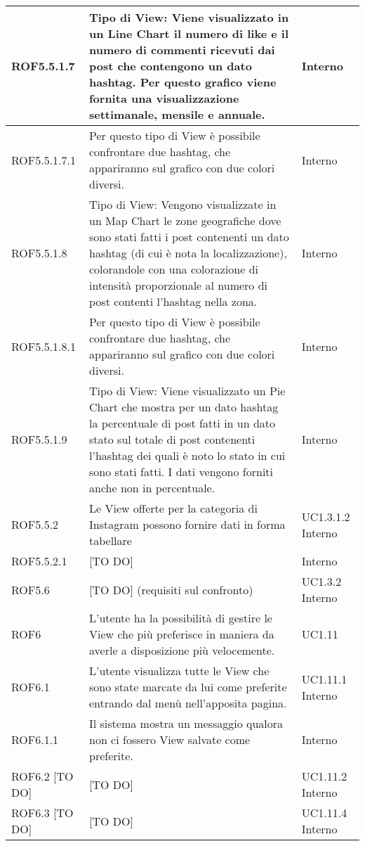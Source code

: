 \begin{center}
\begin{longtable}{| p{2cm} | p{8cm} | p{2cm} |}
		ROF5.5.1.7  &  Tipo di View: Viene visualizzato in un Line Chart il numero di like e il numero di commenti ricevuti dai post che contengono un dato hashtag. Per questo grafico viene fornita una visualizzazione settimanale, mensile e annuale. & Interno \\
		\hline
		ROF5.5.1.7.1  &  Per questo tipo di View è possibile confrontare due hashtag, che appariranno sul grafico con due colori diversi. & Interno \\
		\hline
		ROF5.5.1.8  &  Tipo di View: Vengono visualizzate in un Map Chart le zone geografiche dove sono stati fatti i post contenenti un dato hashtag (di cui è nota la localizzazione), colorandole con una colorazione di intensità proporzionale al numero di post contenti l'hashtag nella zona. & Interno \\
		\hline
		ROF5.5.1.8.1  &  Per questo tipo di View è possibile confrontare due hashtag, che appariranno sul grafico con due colori diversi. & Interno \\
		\hline
		ROF5.5.1.9  &  Tipo di View: Viene visualizzato un Pie Chart che mostra per un dato hashtag la percentuale di post fatti in un dato stato sul totale di post contenenti l'hashtag dei quali è noto lo stato in cui sono stati fatti. I dati vengono forniti anche non in percentuale.& Interno \\
		\hline

		ROF5.5.2  & Le View offerte per la categoria di Instagram possono fornire dati in forma tabellare  &  UC1.3.1.2 \newline Interno \\
		\hline
		ROF5.5.2.1  &  [TO DO] & Interno \\
		\hline

		ROF5.6  &  [TO DO] (requisiti sul confronto) &  UC1.3.2 \newline Interno \\
		\hline


		ROF6  & L'utente ha la possibilità di gestire le View che più preferisce in maniera da averle a disposizione più velocemente. & UC1.11 \\
		\hline
		ROF6.1  & L'utente visualizza tutte le View che sono state marcate da lui come preferite entrando dal menù nell'apposita pagina. & UC1.11.1 \newline Interno \\
		\hline
		ROF6.1.1  & Il sistema mostra un messaggio qualora non ci fossero View salvate come preferite. &  Interno \\
		\hline
		ROF6.2 [TO DO] & [TO DO]  & UC1.11.2 \newline Interno \\
		\hline
		ROF6.3 [TO DO] & [TO DO]  & UC1.11.4 \newline Interno \\
		\hline




\end{longtable}
\end{center}
